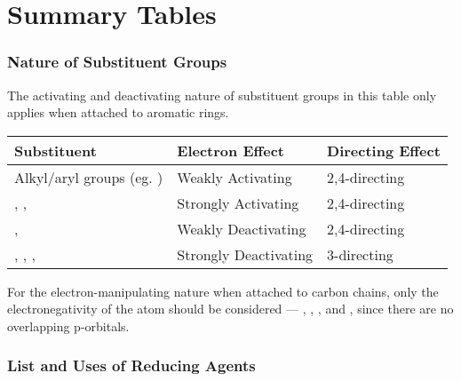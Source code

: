 
\pagebreak
\hypertarget{AppendixSummaryTables}{}
\part{Summary Tables}

	\section{Nature of Substituent Groups}

		The activating and deactivating nature of substituent groups in this table only applies when attached to aromatic rings.

		\begin{center}\begin{table}[htb]\renewcommand{\arraystretch}{1.5}
		\begin{tabu} to \textwidth {| X[-4,c,m] | X[c,m] | X[c,m] |}

			\hline
						Substituent						&	Electron Effect			&	Directing Effect	\\	\hline
			Alkyl/aryl groups (eg. )			&	Weakly Activating		&	2,4-directing		\\	\hline
			, , 				&	Strongly Activating		&	2,4-directing		\\	\hline
			\ch{-\chlorine}, 					&	Weakly Deactivating		&	2,4-directing		\\	\hline
			, , , 	&	Strongly Deactivating	&	3-directing			\\	\hline

		\end{tabu}
		\end{table}\end{center}\vspace{-10mm}



		For the electron-manipulating nature when attached to carbon chains, only the electronegativity of the atom should
		be considered --- , , , and \ch{\chlorine}, since there are no overlapping p-orbitals.





	\hypertarget{AppendixReducingAgents}{}
	\section{List and Uses of Reducing Agents}

